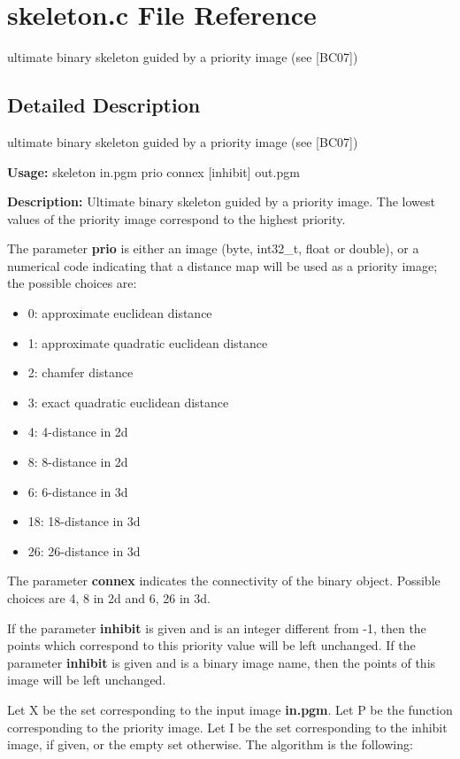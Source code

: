 \section{skeleton.c File Reference}
\label{skeleton_8c}
ultimate binary skeleton guided by a priority image (see [BC07])  




\label{_details}
\subsection{Detailed Description}
ultimate binary skeleton guided by a priority image (see [BC07]) 

{\bf Usage:} skeleton in.pgm prio connex [inhibit] out.pgm

{\bf Description:} Ultimate binary skeleton guided by a priority image. The lowest values of the priority image correspond to the highest priority.

The parameter {\bf prio} is either an image (byte, int32\_\-t, float or double), or a numerical code indicating that a distance map will be used as a priority image; the possible choices are: \begin{itemize}
\item 0: approximate euclidean distance \item 1: approximate quadratic euclidean distance \item 2: chamfer distance \item 3: exact quadratic euclidean distance \item 4: 4-distance in 2d \item 8: 8-distance in 2d \item 6: 6-distance in 3d \item 18: 18-distance in 3d \item 26: 26-distance in 3d\end{itemize}
The parameter {\bf connex} indicates the connectivity of the binary object. Possible choices are 4, 8 in 2d and 6, 26 in 3d.

If the parameter {\bf inhibit} is given and is an integer different from -1, then the points which correspond to this priority value will be left unchanged. If the parameter {\bf inhibit} is given and is a binary image name, then the points of this image will be left unchanged.

Let X be the set corresponding to the input image {\bf in.pgm}. Let P be the function corresponding to the priority image. Let I be the set corresponding to the inhibit image, if given, or the empty set otherwise. The algorithm is the following:




